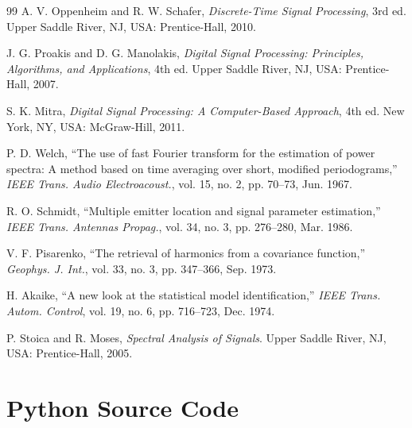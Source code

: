 \documentclass[12pt, a4paper]{article}
\begin{document}
\begin{thebibliography}{99}
A. V. Oppenheim and R. W. Schafer, \textit{Discrete-Time Signal Processing}, 3rd ed. Upper Saddle River, NJ, USA: Prentice-Hall, 2010.

J. G. Proakis and D. G. Manolakis, \textit{Digital Signal Processing: Principles, Algorithms, and Applications}, 4th ed. Upper Saddle River, NJ, USA: Prentice-Hall, 2007.

S. K. Mitra, \textit{Digital Signal Processing: A Computer-Based Approach}, 4th ed. New York, NY, USA: McGraw-Hill, 2011.

P. D. Welch, ``The use of fast Fourier transform for the estimation of power spectra: A method based on time averaging over short, modified periodograms,'' \textit{IEEE Trans. Audio Electroacoust.}, vol. 15, no. 2, pp. 70--73, Jun. 1967.

R. O. Schmidt, ``Multiple emitter location and signal parameter estimation,'' \textit{IEEE Trans. Antennas Propag.}, vol. 34, no. 3, pp. 276--280, Mar. 1986.

V. F. Pisarenko, ``The retrieval of harmonics from a covariance function,'' \textit{Geophys. J. Int.}, vol. 33, no. 3, pp. 347--366, Sep. 1973.

H. Akaike, ``A new look at the statistical model identification,'' \textit{IEEE Trans. Autom. Control}, vol. 19, no. 6, pp. 716--723, Dec. 1974.

P. Stoica and R. Moses, \textit{Spectral Analysis of Signals}. Upper Saddle River, NJ, USA: Prentice-Hall, 2005.
\end{thebibliography}

\appendix
\section{Python Source Code}
\end{document}
